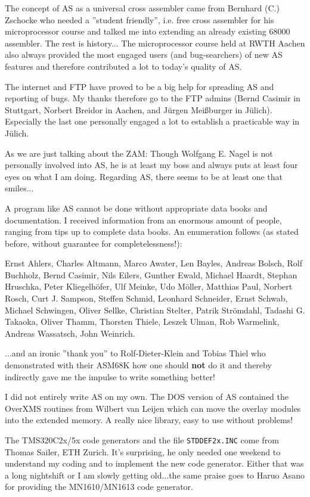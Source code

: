 \documentclass[12pt,twoside]{report}
\newcommand{\bb}[1]{{\bf #1}}
\newcommand{\tty}[1]{{\tt #1}}
\begin{document}
The concept of AS as a universal cross assembler came from Bernhard
(C.) Zschocke who needed a ''student friendly'', i.e. free cross
assembler for his microprocessor course and talked me into extending
an already existing 68000 assembler.  The rest is history...
The microprocessor course held at RWTH Aachen also always provided the
most engaged users (and bug-searchers) of new AS features and
therefore contributed a lot to today's quality of AS.

The internet and FTP have proved to be a big help for spreading AS and
reporting of bugs.  My thanks therefore go to the FTP admins (Bernd
Casimir in Stuttgart, Norbert Breidor in Aachen, and J\"urgen Mei\ss\-burger
in J\"ulich).  Especially the last one personally engaged a lot to
establish a practicable way in J\"ulich.

As we are just talking about the ZAM: Though Wolfgang E. Nagel is not
personally involved into AS, he is at least my boss and always puts
at least four eyes on what I am doing.  Regarding AS, there seems to
be at least one that smiles...

A program like AS cannot be done without appropriate data books and
documentation.  I received information from an enormous amount of
people, ranging from tips up to complete data books.  An enumeration
follows (as stated before, without guarantee for completelessness!):

Ernst Ahlers, Charles Altmann, Marco Awater, Len Bayles,
Andreas Bolsch, Rolf Buchholz, Bernd Casimir, Nils Eilers,
Gunther Ewald, Michael Haardt, Stephan Hruschka, Peter Kliegelh\"ofer,
Ulf Meinke, Udo M\"oller, Matthias Paul, Norbert Rosch, Curt J. Sampson,
Steffen Schmid, Leonhard Schneider, Ernst Schwab, Michael Schwingen,
Oliver Sellke, Christian Stelter, Patrik Str\"omdahl,
Tadashi G. Takaoka, Oliver Thamm, Thorsten Thiele, Leszek Ulman,
Rob Warmelink, Andreas Wassatsch, John Weinrich.

...and an ironic ''thank you'' to Rolf-Dieter-Klein and Tobias Thiel who
demonstrated with their ASM68K how one should \bb{not} do it and thereby
indirectly gave me the impulse to write something better!

I did not entirely write AS on my own. The DOS version of AS contained
the OverXMS routines from Wilbert van Leijen which can move the overlay
modules into the extended memory.  A really nice library, easy to use
without problems!

The TMS320C2x/5x code generators and the file \tty{STDDEF2x.INC} come
from Thomas Sailer, ETH Zurich.  It's surprising, he only needed one
weekend to understand my coding and to implement the new code generator.
Either that was a long nightshift or I am slowly getting old...the same
praise goes to Haruo Asano for providing the MN1610/MN1613 code generator.
\end{document}
